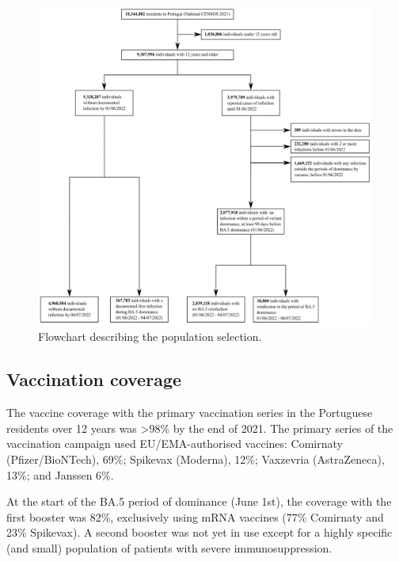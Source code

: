 \begin{figure}
    \centering
    \includegraphics[width=\linewidth]{chapter/2022-covid19-01/figures/figs1-flowchart-01.png}
    \caption[Flowchart describing the population selection]{Flowchart describing the population selection.}
    \label{fig:covid19-01-flowchart}
\end{figure}

\clearpage
\subsection{Vaccination coverage}

The vaccine coverage with the primary vaccination series in the Portuguese residents over 12 years was >98\% by the end of 2021. The primary series of the vaccination campaign used EU/EMA-authorised vaccines: Comirnaty (Pfizer/BioNTech), 69\%; Spikevax (Moderna), 12\%; Vaxzevria (AstraZeneca), 13\%; and Janssen 6\%.

At the start of the BA.5 period of dominance (June 1st), the coverage with the first booster was 82\%, exclusively using mRNA vaccines (77\% Comirnaty and 23\% Spikevax). A second booster was not yet in use except for a highly specific (and small) population of patients with severe immunosuppression. 

